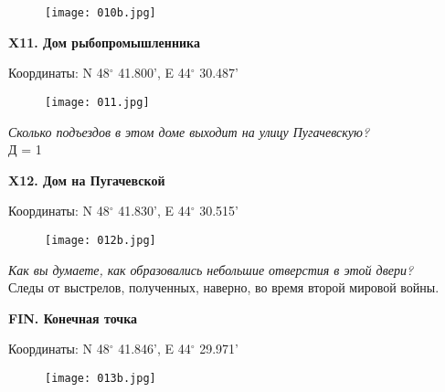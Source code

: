 \documentclass[pscyr]{hedwork}
\begin{document}
  \begin{figure}[h!]
    \center
    \texttt{[image: 010b.jpg]}
  \end{figure}

  \newpage

  \textbf{X11. Дом рыбопромышленника}

  Координаты: N 48\( ^\circ \) 41.800', E 44\( ^\circ \) 30.487'

  \begin{figure}[h!]
    \center
    \texttt{[image: 011.jpg]}
  \end{figure}

  \emph{Сколько подъездов в этом доме выходит на улицу Пугачевскую?} \\
  Д = 1

  \newpage

  \textbf{X12. Дом на Пугачевской}

  Координаты: N 48\( ^\circ \) 41.830', E 44\( ^\circ \) 30.515'

  \begin{figure}[h!]
    \center
    \texttt{[image: 012b.jpg]}
  \end{figure}
  
  \emph{Как вы думаете, как образовались небольшие отверстия в этой двери?} \\
  Следы от выстрелов, полученных, наверно, во время второй мировой войны.
  \newpage

  \textbf{FIN. Конечная точка}

  Координаты: N 48\( ^\circ \) 41.846', E 44\( ^\circ \) 29.971'

  \begin{figure}[h!]
    \center
    \texttt{[image: 013b.jpg]}
  \end{figure}
  \newpage
\end{document}
